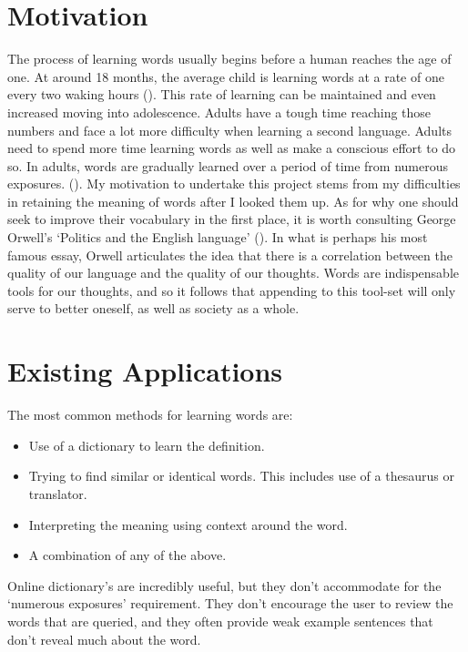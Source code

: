 \section{Motivation}
The process of learning words usually begins before a human reaches the age of one. At around 18 months, the average child is learning words at a rate of one every two waking hours (\cite{pinker1995language,clark1995lexicon}). This rate of learning can be maintained and even increased moving into adolescence. Adults have a tough time reaching those numbers and face a lot more difficulty when learning a second language. Adults need to spend more time learning words as well as make a conscious effort to do so. In adults, words are gradually
learned over a period of time from numerous exposures. (\cite{schmitt2000vocabulary}). My motivation to undertake this project stems from my difficulties in retaining the meaning of words after I looked them up. As for why one should seek to improve their vocabulary in the first place, it is worth consulting George Orwell's `Politics and the English language' (\cite{orwell1968politics}). In what is perhaps his most famous essay, Orwell articulates the idea that there is a correlation between the quality of our language and the quality of our thoughts. Words are indispensable tools for our thoughts, and so it follows that appending to this tool-set will only serve to better oneself, as well as society as a whole. 


\section{Existing Applications}

The most common methods for learning words are:

\begin{itemize}
    \item Use of a dictionary to learn the definition.
    \item Trying to find similar or identical words. This includes use of a thesaurus or translator.
    \item Interpreting the meaning using context around the word.
    \item A combination of any of the above.
\end{itemize}


Online dictionary's are incredibly useful, but they don't accommodate for the `numerous exposures' requirement. They don't encourage the user to review the words that are queried, and they often provide weak example sentences that don't reveal much about the word.\\ 

